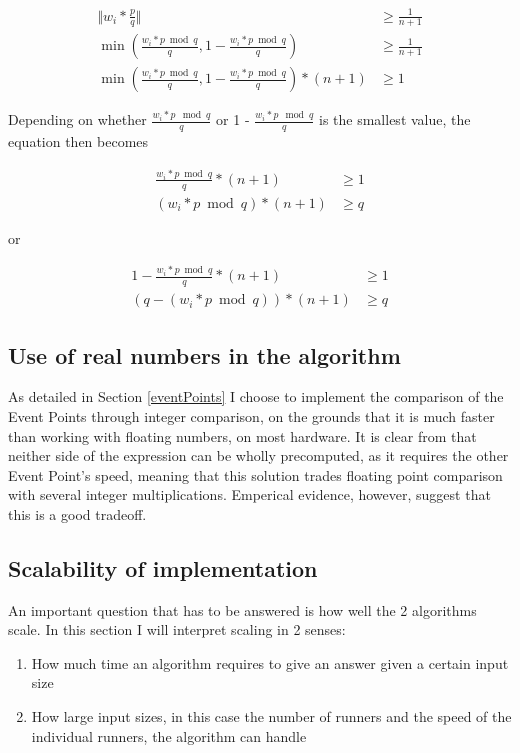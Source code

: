 \begin{equation}
\label{compareRewriteOne}
\begin{split}
\Vert w_i * \frac{p}{q}\Vert &\geq \frac{1}{n+1}\\
\min(\frac{w_i * p \bmod q}{q}, 1 - \frac{w_i * p \bmod q}{q}) &\geq \frac{1}{n+1}\\
\min(\frac{w_i * p \bmod q}{q}, 1 - \frac{w_i * p \bmod q}{q}) * (n+1) &\geq 1
\end{split}
\end{equation}

Depending on whether $\frac{w_i * p \mod q}{q}$ or 1 - $\frac{w_i * p \mod q}{q}$ is the smallest value, the equation then becomes

\begin{equation}
\label{compareRewriteTwo}
\begin{split}
\frac{w_i * p \bmod q}{q} * (n+1) &\geq 1\\
(w_i * p \bmod q) * (n+1) &\geq q 
\end{split}
\end{equation}

or 

\begin{equation}
\label{compareRewriteThree}
\begin{split}
1 - \frac{w_i * p \bmod q}{q} * (n+1) &\geq 1\\
(q - (w_i * p \bmod q)) * (n+1) &\geq q
\end{split}
\end{equation}

\subsection{Use of real numbers in the algorithm}
As detailed in Section \ref{eventPoints} I choose to implement the comparison of the Event Points through integer comparison, on the grounds that it is much faster than working with floating numbers, on most hardware. It is clear from  that neither side of the expression can be wholly precomputed, as it requires the other Event Point's speed, meaning that this solution trades floating point comparison with several integer multiplications. Emperical evidence, however, suggest that this is a good tradeoff.

\subsection{Scalability of implementation}
\label{scale}
An important question that has to be answered is how well the 2 algorithms scale. In this section I will interpret scaling in 2 senses:
\begin{enumerate}
\item How much time an algorithm requires to give an answer given a certain input size
\item How large input sizes, in this case the number of runners and the speed of the individual runners, the algorithm can handle
\end{enumerate}

